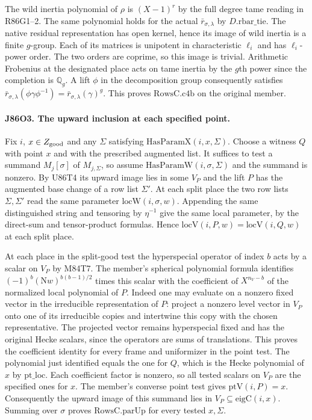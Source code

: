 The wild inertia polynomial of $\rho$ is $(X-1)^r$ by the full
degree tame reading in R86G1--2. The same polynomial holds for the
actual $\bar r_{\sigma,\lambda}$ by $D.\mathrm{rbar\_tie}$. The
native residual representation has open kernel, hence its image of
wild inertia is a finite $g$-group. Each of its matrices is unipotent
in characteristic $\ell_i$ and has $\ell_i$-power order. The two
orders are coprime, so this image is trivial. Arithmetic Frobenius at
the designated place acts on tame inertia by the $g$th power since
the completion is $\mathbb Q_g$. A lift $\phi$ in the decomposition
group consequently satisfies
$\bar r_{\sigma,\lambda}(\phi\gamma\phi^{-1})
=\bar r_{\sigma,\lambda}(\gamma)^g$. This proves
$\mathrm{RowsC.c4b}$ on the original member.

\paragraph{J86O3. The upward inclusion at each specified point.}
Fix $i$, $x\in Z_{\rm good}$ and any $\Sigma$ satisfying
$\mathrm{HasParamX}(i,x,\Sigma)$. Choose a witness $Q$ with
point $x$ and with the prescribed augmented list. It suffices to
test a summand $M_j[\sigma]$ of $M_{j,\Sigma}$, so assume
$\mathrm{HasParamW}(i,\sigma,\Sigma)$ and the summand is nonzero.
By U86T4 its upward image lies in some $V_P$ and the lift $P$
has the augmented base change of a row list $\Sigma'$.
At each split place the two row lists $\Sigma,\Sigma'$ read
the same parameter $\mathrm{locW}(i,\sigma,w)$. Appending the
same distinguished string and tensoring by $\eta^{-1}$ give
the same local parameter, by the direct-sum and tensor-product
formulas. Hence $\mathrm{locV}(i,P,w)=\mathrm{locV}(i,Q,w)$
at each split place.

At each place in the split-good test the hyperspecial operator
of index $b$ acts by a scalar on $V_P$ by M84T7. The member's
spherical polynomial formula identifies $(-1)^b(\mathrm Nw)^{b(b-1)/2}$
times this scalar with the coefficient of $X^{n_V-b}$ of the
normalized local polynomial of $P$. Indeed one may evaluate on a
nonzero fixed vector in the irreducible representation of $P$:
project a nonzero level vector in $V_P$ onto one of its irreducible
copies and intertwine this copy with the chosen representative.
The projected vector remains hyperspecial fixed and has the original
Hecke scalars, since the operators are sums of translations. This
proves the coefficient identity for every frame and uniformizer in
the point test. The polynomial just identified equals the one for
$Q$, which is the Hecke polynomial of $x$ by $\mathrm{pt\_loc}$.
Each coefficient factor is nonzero, so all tested scalars on $V_P$
are the specified ones for $x$. The member's converse point test
gives $\mathrm{ptV}(i,P)=x$. Consequently the upward image of this
summand lies in $V_P\subseteq\mathrm{eigC}(i,x)$. Summing over
$\sigma$ proves $\mathrm{RowsC.parUp}$ for every tested $x,\Sigma$.
